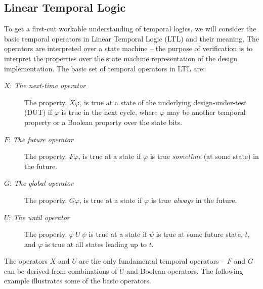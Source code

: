 \subsection{Linear Temporal Logic} \label{sec2.1.1}
To get a first-cut workable understanding of temporal logics, we 
will consider the basic temporal operators in Linear Temporal Logic (LTL) 
and their meaning. The operators are
interpreted over a state machine -- the purpose of verification is to interpret
the properties over the state machine representation of the design
implementation. The basic set of temporal operators in LTL are:
\begin{description}

\item[$X$: {\em The next-time operator}] The property, $X\varphi$, is true
    at a state of the underlying design-under-test (DUT) if $\varphi$
    is true in the next cycle, where $\varphi$ may be another temporal
    property or a Boolean property over the state bits.

\item[$F$: {\em The future operator}] The property, $F\varphi$, is true at a
    state if $\varphi$ is true {\em sometime} (at some state) in the
    future.

\item[$G$: {\em The global operator}] The property, $G\varphi$, is true at a
    state if $\varphi$ is true {\em always} in the future.

\item[$U$: {\em The until operator}] The property, $\varphi\ U\ \psi$ is
    true at a state if $\psi$ is true at some future state, $t$, and
    $\varphi$ is true at all states leading up to $t$.

\end{description}
\noindent
The operators $X$ and $U$ are the only fundamental temporal operators -- $F$
and $G$ can be derived from combinations of $U$ and Boolean operators. 
The following example illustrates some of the basic operators.

